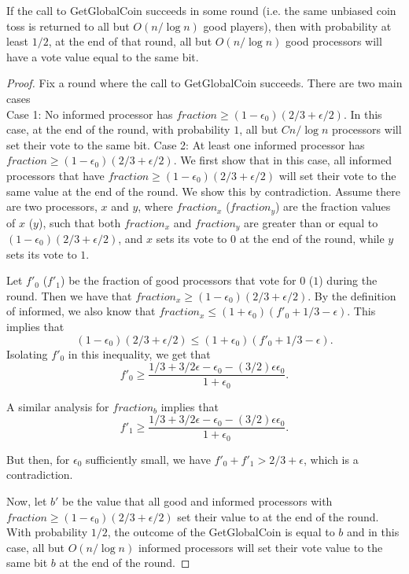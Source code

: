 \documentclass{sig-alternate}
\begin{document}
\begin{lemma} \label{l:term}
If the call to GetGlobalCoin succeeds in some round (i.e. the same unbiased coin toss is returned to all but $O(n/\log n)$ good players), then with probability at least $1/2$, at the end of that round, all but $O(n/ \log n)$ good processors will have a vote value equal to the same bit.
\end{lemma}

\begin{proof}
Fix a round where the call to GetGlobalCoin succeeds.  There are two main cases\\
\noindent
Case 1: No informed processor has $fraction \geq (1-\epsilon_{0}) (2/3 + \epsilon/2)$.  In this case, at the end of the round, with probability $1$, all but $Cn/\log n$ processors will set their vote to the same bit.
\noindent
Case 2: At least one informed processor has $fraction \geq (1-\epsilon_{0}) (2/3 + \epsilon/2)$.  We first show that in this case, all informed processors that have 
$fraction \geq (1-\epsilon_{0}) (2/3 + \epsilon/2)$ will set their vote to the same value at the end of the round.  We show this by contradiction.  Assume there are two processors, $x$ and $y$, where $fraction_{x}$ ($fraction_{y}$) are the fraction values of $x$ ($y$), such that both $fraction_{x}$ and $fraction_{y}$ are greater than or equal to $(1-\epsilon_{0}) (2/3 + \epsilon/2)$, and $x$ sets its vote to $0$ at the end of the round, while $y$ sets its vote to $1$.

Let $f'_{0}$ ($f'_{1}$) be the fraction of good processors that vote for $0$ ($1$) during the round.  Then we have that $fraction_{x} \geq (1-\epsilon_{0}) (2/3 + \epsilon/2)$.  By the definition of informed, we also know that $fraction_{x} \leq (1+\epsilon_{0}) (f'_{0} + 1/3 - \epsilon)$.  This implies that
$$ (1-\epsilon_{0})(2/3 + \epsilon/2) \leq (1+\epsilon_{0})(f'_{0} + 1/3 - \epsilon). $$  Isolating $f'_{0}$ in this inequality, we get that
$$f'_{0} \geq \frac{1/3 + 3/2 \epsilon - \epsilon_{0} - (3/2) \epsilon \epsilon_{0}}{1+\epsilon_{0}}.$$

A similar analysis for $fraction_{b}$ implies that
$$ f'_{1} \geq \frac{1/3 + 3/2 \epsilon - \epsilon_{0} - (3/2) \epsilon \epsilon_{0}}{1+\epsilon_{0}}.$$

But then, for $\epsilon_{0}$ sufficiently small, we have $f'_{0} + f'_{1} > 2/3 + \epsilon$, which is a contradiction.  

Now, let $b'$ be the value that all good and informed processors with $fraction \geq (1-\epsilon_{0}) (2/3 + \epsilon/2)$ set their value to at the end of the round.   With probability $1/2$, the outcome of the GetGlobalCoin is equal to $b$ and in this case, all but $O(n/ \log n)$ informed processors will set their vote value to the same bit $b$ at the end of the round.
\end{proof}
\end{document}
